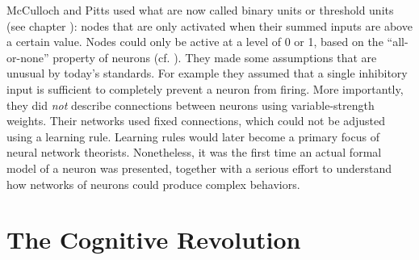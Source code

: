 McCulloch and Pitts used what are now called binary units or threshold units (see chapter ): nodes that are only activated when their summed inputs are above a certain value. Nodes could only be active at a level of 0 or 1, based on the ``all-or-none'' property of neurons (cf. ). They made some assumptions that are unusual by today's standards. For example they assumed that a single inhibitory input is sufficient to completely prevent a neuron from firing. More importantly, they did \emph{not} describe connections between neurons using variable-strength weights. Their networks used fixed connections, which could not be adjusted using a learning rule. Learning rules would later become a primary focus of neural network theorists. Nonetheless, it was the first time an actual formal model of a neuron was presented, together with a serious effort to understand how networks of neurons could produce complex behaviors.


\section{The Cognitive Revolution}\label{cog_rev}

